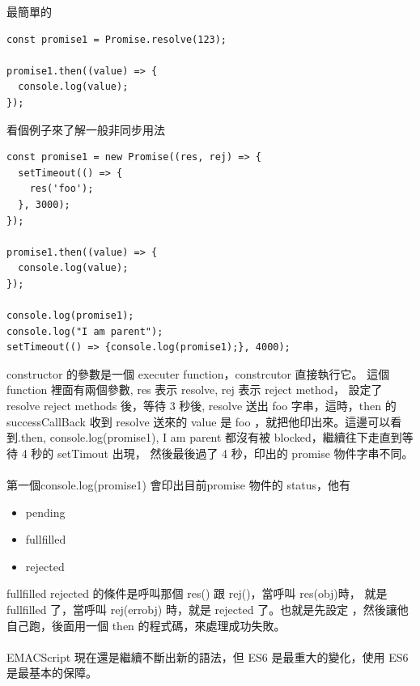   最簡單的
  \begin{verbatim}
const promise1 = Promise.resolve(123);

promise1.then((value) => {
  console.log(value);
});
  \end{verbatim}
  看個例子來了解一般非同步用法
  \begin{verbatim}
const promise1 = new Promise((res, rej) => {
  setTimeout(() => {
    res('foo');
  }, 3000);
});

promise1.then((value) => {
  console.log(value);
});

console.log(promise1);
console.log("I am parent");
setTimeout(() => {console.log(promise1);}, 4000);
  \end{verbatim}
  constructor 的參數是一個 executer function，constrcutor 直接執行它。
  這個 function 裡面有兩個參數, res 表示 resolve, rej 表示 reject method，
  設定了 resolve reject methods 後，等待 3 秒後,
  resolve 送出 foo 字串，這時，then 的 successCallBack 收到 resolve 送來的
  value 是 foo ，就把他印出來。這邊可以看到.then, console.log(promise1),
  I am parent 都沒有被 blocked，繼續往下走直到等待 4 秒的 setTimout 出現，
  然後最後過了 4 秒，印出的 promise 物件字串不同。
  \\\\
  第一個console.log(promise1) 會印出目前promise 物件的 status，他有
  \begin{itemize}
    \item pending
    \item fullfilled
    \item rejected
  \end{itemize}
  fullfilled rejected 的條件是呼叫那個 res() 跟 rej()，當呼叫 res(obj)時，
  就是 fullfilled 了，當呼叫 rej(errobj) 時，就是 rejected 了。也就是先設定
  ，然後讓他自己跑，後面用一個 then 的程式碼，來處理成功失敗。
  \\\\
  EMACScript 現在還是繼續不斷出新的語法，但 ES6 是最重大的變化，使用 ES6
  是最基本的保障。
